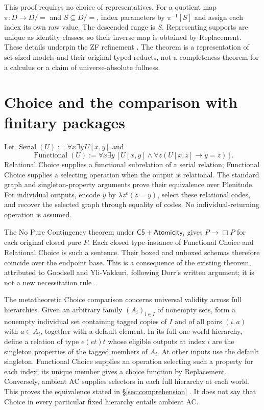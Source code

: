 \documentclass[12pt,letterpaper]{article}
\newcommand{\Cfive}{\mathsf{C5}}
\newcommand{\At}{\mathsf{Atomicity}}
\begin{document}
This proof requires no choice of representatives. For a quotient map $\pi:D\to D/{=}$ and $S\subseteq D/{=}$, index parameters by $\pi^{-1}[S]$ and assign each index its own raw value. The descended range is $S$. Representing supports are unique as identity classes, so their inverse map is obtained by Replacement. These details underpin the ZF refinement \citep[\S\S3, 5]{intrinsic}. The theorem is a representation of set-sized models and their original typed reducts, not a completeness theorem for a calculus or a claim of universe-absolute fullness.

\section{Choice and the comparison with finitary packages}\label{app:choice}

Let $\operatorname{Serial}(U):=\forall x\exists y\,U[x,y]$ and
\[
 \operatorname{Functional}(U):=
 \forall x\exists y\,[U[x,y]\land\forall z(U[x,z]\to y=z)].
\]
Relational Choice supplies a functional subrelation of a serial relation; Functional Choice supplies a selecting operation when the output is relational. The standard graph and singleton-property arguments prove their equivalence over Plenitude. For individual outputs, encode $y$ by $\lambda z^e(z=y)$, select these relational codes, and recover the selected graph through equality of codes. No individual-returning operation is assumed.

The No Pure Contingency theorem under $\Cfive+\At_t$ gives $P\to\Box P$ for each original closed pure $P$. Each closed type-instance of Functional Choice and Relational Choice is such a sentence. Their boxed and unboxed schemas therefore coincide over the endpoint base. This is a consequence of the existing theorem, attributed to Goodsell and Yli-Vakkuri, following Dorr's written argument; it is not a new necessitation rule \citep{npc}.

The metatheoretic Choice comparison concerns universal validity across full hierarchies. Given an arbitrary family $(A_i)_{i\in I}$ of nonempty sets, form a nonempty individual set containing tagged copies of $I$ and of all pairs $(i,a)$ with $a\in A_i$, together with a default element. In its full one-world hierarchy, define a relation of type $e(et)t$ whose eligible outputs at index $i$ are the singleton properties of the tagged members of $A_i$. At other inputs use the default singleton. Functional Choice supplies an operation selecting such a property for each index; its unique member gives a choice function by Replacement. Conversely, ambient AC supplies selectors in each full hierarchy at each world. This proves the equivalence stated in \S\ref{sec:comprehension} \citep[\S6]{intrinsic}. It does not say that Choice in every particular fixed hierarchy entails ambient AC.
\end{document}

